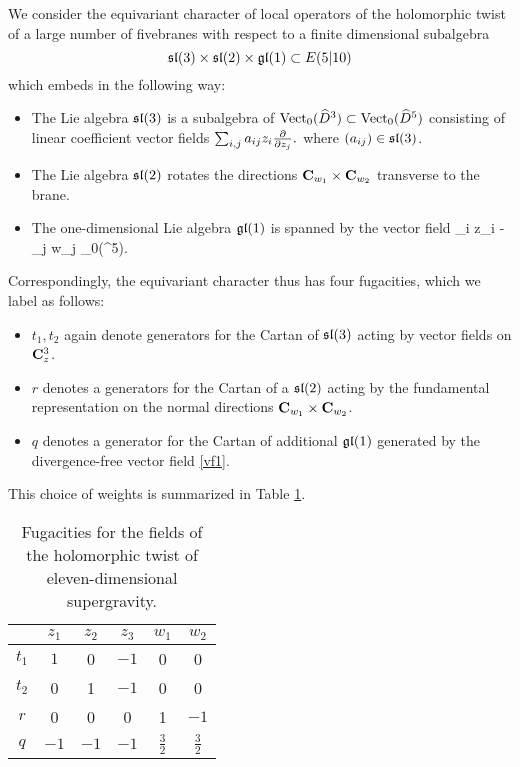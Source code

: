 \documentclass[11pt]{amsart}
\begin{document}
\parsec

We consider the equivariant character of local operators of the holomorphic twist of a large number of fivebranes with respect to a finite dimensional subalgebra 
\[
\mathfrak{sl}(3)\times \mathfrak{sl}(2)\times \mathfrak{gl}(1)\subset E(5|10)
\]
which embeds in the following way:
\begin{itemize}
\item The Lie algebra $\mathfrak{sl}(3)$ is a subalgebra of $\operatorname{Vect}_0(\widehat{D}^3) \subset \operatorname{Vect}_0 (\widehat{D}^5)$ consisting of linear coefficient vector fields $\sum_{i,j} a_{ij} z_i \frac{\partial}{\partial z_j}.$
where $(a_{ij}) \in \mathfrak{sl}(3)$. 
\item The Lie algebra $\mathfrak{sl}(2)$ rotates the directions $\mathbf{C}_{w_1} \times \mathbf{C}_{w_2}$ transverse to the brane.
\item The one-dimensional Lie algebra $\mathfrak{gl}(1)$ is spanned by the vector field 
\beqn\label{vf1}
\sum_i z_i  -  \sum_{j} w_j  \in \Vect_0(^5).
\eeqn
\end{itemize}

Correspondingly, the equivariant character thus has four fugacities, which we label as follows:
\begin{itemize}
  \item $t_{1}, t_{2}$ again denote generators for the Cartan of $\mathfrak{sl}(3)$ acting by vector fields on $\mathbf{C}^{3}_{z}$.
  \item $r$ denotes a generators for the Cartan of a $\mathfrak{sl}(2)$ acting by the fundamental representation on the normal directions $\mathbf{C}_{w_1} \times \mathbf{C}_{w_2}$.
  \item $q$ denotes a generator for the Cartan of additional $\mathfrak{gl}(1)$ generated by the divergence-free vector field \eqref{vf1}. 
\end{itemize}

This choice of weights is summarized in Table \ref{tbl:sugra}.

\begin{table}
\begin{center}
\begin{tabular}{c c c c c c}
  & $z_{1}$ & $z_{2}$ & $z_{3}$ & $w_{1}$ & $w_{2}$ \\
  \hline
  $t_{1}$ & $1$ & 0 & $-1$ & 0 & 0 \\
  $t_{2}$ & 0 & 1 & $-1$ & 0 & 0 \\
  $r$ & 0 & 0 & 0 & 1 & $-1$ \\
  $q$ & $-1$ & $-1$ & $-1$ & $\frac{3}{2}$ & $\frac{3}{2}$
\end{tabular}
\caption{Fugacities for the fields of the holomorphic twist of eleven-dimensional supergravity.}
\label{tbl:sugra}
\end{center}
\end{table}
\end{document}
